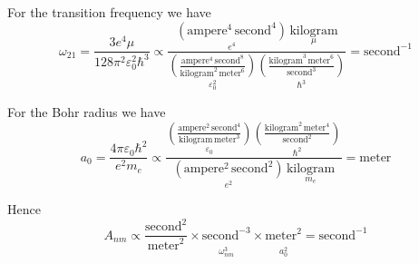 \documentclass[12pt]{article}
\begin{document}
\noindent
For the transition frequency we have
\begin{equation*}
\omega_{21}=
\frac{3e^4\mu}{128\pi^2\varepsilon_0^2\hbar^3}
\propto
\frac{
\underset{e^4}
{\left(\text{ampere}^4\,\text{second}^4\right)}
\,
\underset{\mu}
{\text{kilogram}}
}
{
\underset{\varepsilon_0^2}
{\left(\frac{\text{ampere}^4\,\text{second}^8}{\text{kilogram}^2\,\text{meter}^6}\right)}
\underset{\hbar^3}
{\left(\frac{\text{kilogram}^3\,\text{meter}^6}{\text{second}^3}\right)}
}
=\text{second}^{-1}
\end{equation*}

\noindent
For the Bohr radius we have
\begin{equation*}
a_0=\frac{4\pi\varepsilon_0\hbar^2}{e^2 m_e}
\propto
\frac
{
\underset{\varepsilon_0}
{\left(\frac{\text{ampere}^2\,\text{second}^4}{\text{kilogram}\,\text{meter}^3}\right)}
\underset{\hbar^2}
{\left(\frac{\text{kilogram}^2\,\text{meter}^4}{\text{second}^2}\right)}
}
{
\underset{e^2}
{\left(\text{ampere}^2\,\text{second}^2\right)}
\,
\underset{m_e}
{\text{kilogram}}
}
=\text{meter}
\end{equation*}

\noindent
Hence
\begin{equation*}
A_{nm}\propto
\frac{\text{second}^2}{\text{meter}^2}
\times
\underset{\substack{\\[1ex]\omega_{nm}^3}}{\text{second}^{-3}}
\times
\underset{\substack{\\[1ex]a_0^2}}{\text{meter}^2}
=\text{second}^{-1}
\end{equation*}
\end{document}

